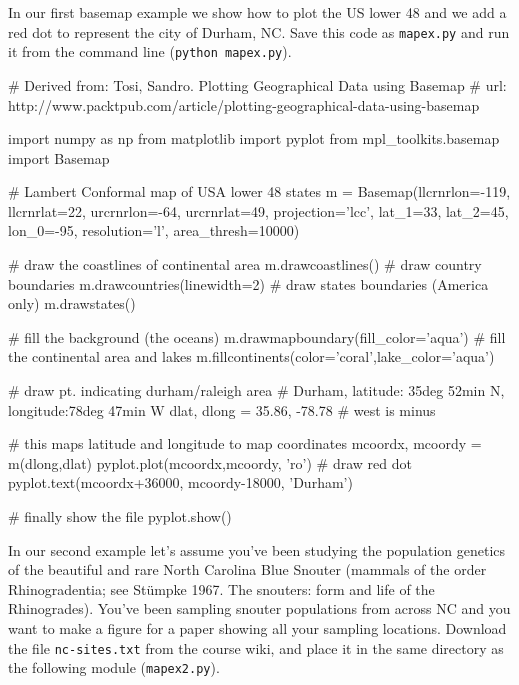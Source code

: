 In our first basemap example we show how to plot the US lower 48 and we
add a red dot to represent the city of Durham, NC. Save this code as
\lstinline!mapex.py! and run it from the command line
(\lstinline!python mapex.py!).

\begin{codeblock}[python]
# Derived from: Tosi, Sandro. Plotting Geographical Data using Basemap
# url: http://www.packtpub.com/article/plotting-geographical-data-using-basemap

import numpy as np
from matplotlib import pyplot
from mpl_toolkits.basemap import Basemap

# Lambert Conformal map of USA lower 48 states
m = Basemap(llcrnrlon=-119, llcrnrlat=22, urcrnrlon=-64,
  urcrnrlat=49, projection='lcc', lat_1=33, lat_2=45,
  lon_0=-95, resolution='l', area_thresh=10000)

# draw the coastlines of continental area
m.drawcoastlines()
# draw country boundaries
m.drawcountries(linewidth=2)
# draw states boundaries (America only)
m.drawstates()

# fill the background (the oceans)
m.drawmapboundary(fill_color='aqua')
# fill the continental area and lakes
m.fillcontinents(color='coral',lake_color='aqua')

# draw pt. indicating durham/raleigh area
# Durham, latitude:  35deg 52min N, longitude:78deg 47min W
dlat, dlong = 35.86, -78.78 # west is minus

# this maps latitude and longitude to map coordinates
mcoordx, mcoordy = m(dlong,dlat)
pyplot.plot(mcoordx,mcoordy, 'ro') # draw red dot
pyplot.text(mcoordx+36000, mcoordy-18000, 'Durham')

# finally show the file
pyplot.show()    
\end{codeblock}
%
In our second example let's assume you've been studying the population
genetics of the beautiful and rare North Carolina Blue Snouter (mammals
of the order Rhinogradentia; see Stümpke 1967. The snouters: form and
life of the Rhinogrades). You've been sampling snouter populations from
across NC and you want to make a figure for a paper showing all your
sampling locations. Download the file \lstinline!nc-sites.txt! from the
course wiki, and place it in the same directory as the following module
(\lstinline!mapex2.py!).

